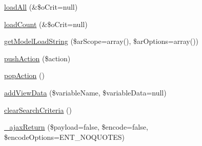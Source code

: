 \begin{DoxyCompactItemize}
\hyperlink{classCXLController_a4e6ee9ca4aff15fe9592ad24f5ebd509}{loadAll} (\&\$oCrit=null)
\item 
\hyperlink{classCXLController_a97e32933f78c7a0e8e6829ac513deb4d}{loadCount} (\&\$oCrit=null)
\item 
\hyperlink{classCXLController_a594123c5fb3f7fab375d51468f7d5074}{getModelLoadString} (\$arScope=array(), \$arOptions=array())
\item 
\hyperlink{classCXLController_a1605f43b777d563c5027f018633e7a30}{pushAction} (\$action)
\item 
\hyperlink{classCXLController_aaebe806c849a4c263ea874b67ba9c98b}{popAction} ()
\item 
\hyperlink{classCXLController_ac265d939123b5e6488026368b49ecd30}{addViewData} (\$variableName, \$variableData=null)
\item 
\hyperlink{classCXLController_aac45f7bcfa0fb866aff383996519ec35}{clearSearchCriteria} ()
\item 
\hyperlink{classCXLController_a7063f698c3d296c849e56a97a007b280}{\_\-ajaxReturn} (\$payload=false, \$encode=false, \$encodeOptions=ENT\_\-NOQUOTES)
\end{DoxyCompactItemize}
